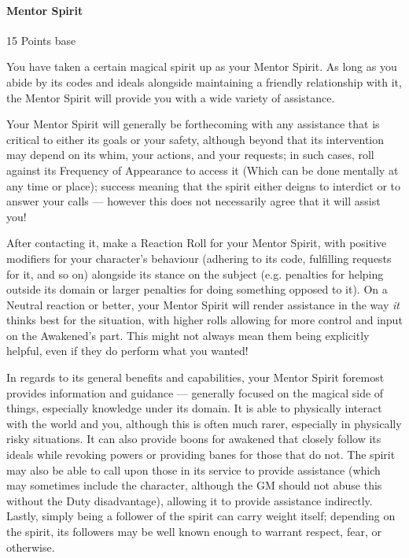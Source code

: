 \begin{multicols}{3}
	\paragraph{Mentor Spirit}\label{mentor_spirit}
	\begin{flushright}
		15 Points base
	\end{flushright}
	
	You have taken a certain magical spirit up as your Mentor Spirit. As long as you abide by its codes and ideals alongside maintaining a friendly relationship with it, the Mentor Spirit will provide you with a wide variety of assistance. 
	
	Your Mentor Spirit will generally be forthecoming with any assistance that is critical to either its goals or your safety, although beyond that its intervention may depend on its whim, your actions, and your requests; in such cases, roll against its Frequency of Appearance to access it (Which can be done mentally at any time or place); success meaning that the spirit either deigns to interdict or to answer your calls — however this does not necessarily agree that it will assist you! 
	
	After contacting it, make a Reaction Roll for your Mentor Spirit, with positive modifiers for your character's behaviour (adhering to its code, fulfilling requests for it, and so on) alongside its stance on the subject (e.g. penalties for helping outside its domain or larger penalties for doing something opposed to it). On a Neutral reaction or better, your Mentor Spirit will render assistance in the way \textit{it} thinks best for the situation, with higher rolls allowing for more control and input on the Awakened's part. This might not always mean them being explicitly helpful, even if they do perform what you wanted!
	
	In regards to its general benefits and capabilities, your Mentor Spirit foremost provides information and guidance — generally focused on the magical side of things, especially knowledge under its domain. It is able to physically interact with the world and you, although this is often much rarer, especially in physically risky situations. It can also provide boons for awakened that closely follow its ideals while revoking powers or providing banes for those that do not. The spirit may also be able to call upon those in its service to provide assistance (which may sometimes include the character, although the GM should not abuse this without the Duty disadvantage), allowing it to provide assistance indirectly. Lastly, simply being a follower of the spirit can carry weight itself; depending on the spirit, its followers may be well known enough to warrant respect, fear, or otherwise.
	

\end{multicols}
